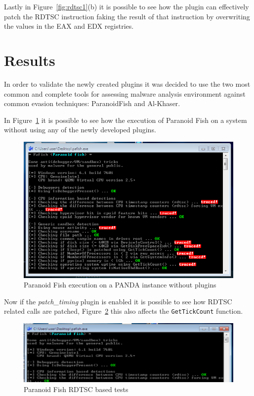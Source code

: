 Lastly in Figure~\ref{fig:rdtsc1}(b) it is possible to see how the plugin can effectively patch the RDTSC instruction faking the result of that instruction by overwriting the values in the EAX and EDX registries. 

\section{Results}

In order to validate the newly created plugins it was decided to use the two most common and complete tools for assessing malware analysis environment against common evasion techniques: ParanoidFish and Al-Khaser.

In Figure~\ref{fig:res} it is possible to see how the execution of Paranoid Fish on a system without using any of the newly developed plugins. 

\begin{figure}[htp]
    \centering
    \includegraphics[width=\linewidth]{images/par3.png}%
    \caption{Paranoid Fish execution on a PANDA instance without plugins}%
    \label{fig:res}%
\end{figure}

Now if the \textit{patch\_timing} plugin is enabled it is possible to see how RDTSC related calls are patched, Figure~\ref{fig:patsc} this also affects the \lstinline{GetTickCount} function. 

\begin{figure}[htp]
    \centering
    \includegraphics[width=\linewidth]{images/rdtpa.png}%
    \caption{Paranoid Fish RDTSC based tests}%
    \label{fig:patsc}%
\end{figure}

